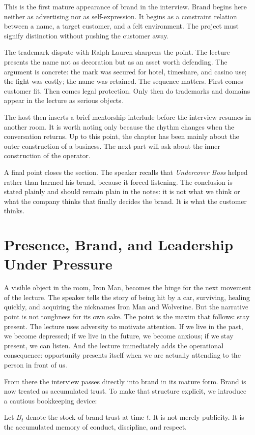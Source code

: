 This is the first mature appearance of brand in the interview. Brand begins here neither as advertising nor as self-expression. It begins as a constraint relation between a name, a target customer, and a felt environment. The project must signify distinction without pushing the customer away.

The trademark dispute with Ralph Lauren sharpens the point. The lecture presents the name not as decoration but as an asset worth defending. The argument is concrete: the mark was secured for hotel, timeshare, and casino use; the fight was costly; the name was retained. The sequence matters. First comes customer fit. Then comes legal protection. Only then do trademarks and domains appear in the lecture as serious objects.

The host then inserts a brief mentorship interlude before the interview resumes in another room. It is worth noting only because the rhythm changes when the conversation returns. Up to this point, the chapter has been mainly about the outer construction of a business. The next part will ask about the inner construction of the operator.

A final point closes the section. The speaker recalls that \emph{Undercover Boss} helped rather than harmed his brand, because it forced listening. The conclusion is stated plainly and should remain plain in the notes: it is not what we think or what the company thinks that finally decides the brand. It is what the customer thinks.

\section{Presence, Brand, and Leadership Under Pressure}

A visible object in the room, Iron Man, becomes the hinge for the next movement of the lecture. The speaker tells the story of being hit by a car, surviving, healing quickly, and acquiring the nicknames Iron Man and Wolverine. But the narrative point is not toughness for its own sake. The point is the maxim that follows: stay present. The lecture uses adversity to motivate attention. If we live in the past, we become depressed; if we live in the future, we become anxious; if we stay present, we can listen. And the lecture immediately adds the operational consequence: opportunity presents itself when we are actually attending to the person in front of us.

From there the interview passes directly into brand in its mature form. Brand is now treated as accumulated trust. To make that structure explicit, we introduce a cautious bookkeeping device:
\begin{definition}
Let \(B_t\) denote the stock of brand trust at time \(t\). It is not merely publicity. It is the accumulated memory of conduct, discipline, and respect.
\end{definition}

